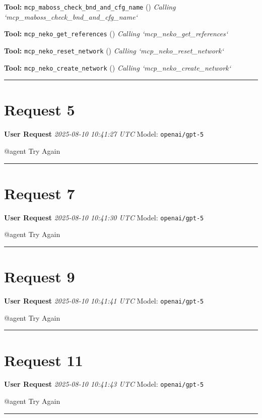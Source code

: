 \documentclass[11pt,a4paper]{article}
\begin{document}
\begin{toolokbox}
\textbf{Tool:} \texttt{mcp\_maboss\_check\_bnd\_and\_cfg\_name} (\checkmark)
\textit{Calling `mcp\_maboss\_check\_bnd\_and\_cfg\_name`}
\end{toolokbox}
\begin{toolokbox}
\textbf{Tool:} \texttt{mcp\_neko\_get\_references} (\checkmark)
\textit{Calling `mcp\_neko\_get\_references`}
\end{toolokbox}
\begin{toolokbox}
\textbf{Tool:} \texttt{mcp\_neko\_reset\_network} (\checkmark)
\textit{Calling `mcp\_neko\_reset\_network`}
\end{toolokbox}
\begin{toolokbox}
\textbf{Tool:} \texttt{mcp\_neko\_create\_network} (\checkmark)
\textit{Calling `mcp\_neko\_create\_network`}
\end{toolokbox}
\bigskip\hrule\bigskip
\section{Request 5}
\begin{userbox}
\textbf{User Request}
\quad \textit{2025-08-10 10:41:27 UTC}
\quad Model: \texttt{openai/gpt-5}

@agent Try Again

\end{userbox}
\bigskip\hrule\bigskip
\section{Request 7}
\begin{userbox}
\textbf{User Request}
\quad \textit{2025-08-10 10:41:30 UTC}
\quad Model: \texttt{openai/gpt-5}

@agent Try Again

\end{userbox}
\bigskip\hrule\bigskip
\section{Request 9}
\begin{userbox}
\textbf{User Request}
\quad \textit{2025-08-10 10:41:41 UTC}
\quad Model: \texttt{openai/gpt-5}

@agent Try Again

\end{userbox}
\bigskip\hrule\bigskip
\section{Request 11}
\begin{userbox}
\textbf{User Request}
\quad \textit{2025-08-10 10:41:43 UTC}
\quad Model: \texttt{openai/gpt-5}

@agent Try Again

\end{userbox}
\bigskip\hrule\bigskip
\end{document}
